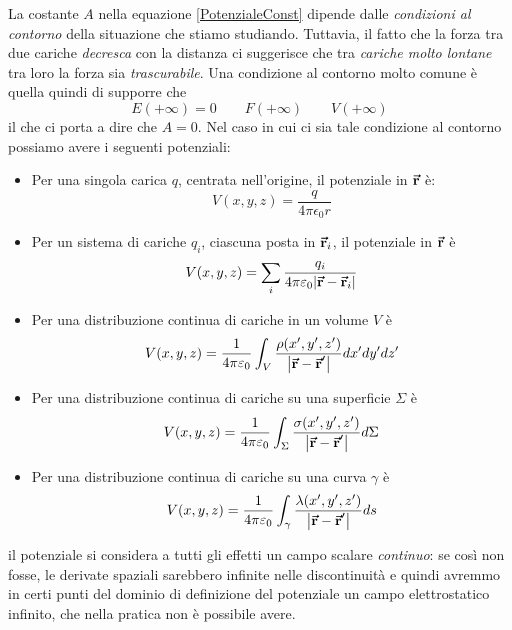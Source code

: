 La costante $A$ nella equazione \eqref{PotenzialeConst} dipende dalle \textit{condizioni al contorno} della situazione che stiamo studiando. Tuttavia, il fatto che la forza tra due cariche \textit{decresca} con la distanza ci suggerisce che tra \textit{cariche molto lontane} tra loro la forza sia \textit{trascurabile}. Una condizione al contorno molto comune è quella quindi di supporre che
\begin{equation}
	E(+\infty)=0\qquad F(+\infty)\qquad V(+\infty)
\end{equation}
il che ci porta a dire che $A=0$. Nel caso in cui ci sia tale condizione al contorno possiamo avere i seguenti potenziali:
\begin{itemize}
	\item Per una singola carica $q$, centrata nell'origine, il potenziale in $\vb*{\va{r}}$ è:
	\begin{equation}
		V(x,y,z)=\frac{q}{4\pi\epsilon_0r}
	\end{equation}
	\item Per un sistema di cariche $q_i$, ciascuna posta in $\vb*{\va{r}}_i$, il potenziale in $\vb*{\va{r}}$ è
	\begin{equation}
		V(x,y,z)=\sum_i\frac{q_i}{4\pi\varepsilon_0\abs{\vb*{\va{r}}-\vb*{\va{r}}_i}}
	\end{equation}
	\item Per una distribuzione continua di cariche in un volume $V$ è
	\begin{equation}
		V(x,y,z)=\frac{1}{4\pi\varepsilon_0}\int_{V}\frac{\rho(x',y',z')}{\abs{\vb*{\va{r}}-\vb*{\va{r}}'}}dx'dy'dz'
	\end{equation}
	\item Per una distribuzione continua di cariche su una superficie $\Sigma$ è
	\begin{equation}
		V(x,y,z)=\frac{1}{4\pi\varepsilon_0}\int_{\Sigma}\frac{\sigma(x',y',z')}{\abs{\vb*{\va{r}}-\vb*{\va{r}}'}}d\Sigma
	\end{equation}
	\item Per una distribuzione continua di cariche su una curva $\gamma$ è
	\begin{equation}
		V(x,y,z)=\frac{1}{4\pi\varepsilon_0}\int_\gamma\frac{\lambda(x',y',z')}{\abs{\vb*{\va{r}}-\vb*{\va{r}}'}}ds
	\end{equation}
\end{itemize}
\begin{observe}\label{PotenzialeContinuo}
	il potenziale si considera a tutti gli effetti un campo scalare \textit{continuo}: se così non fosse, le derivate spaziali sarebbero infinite nelle discontinuità e quindi avremmo in certi punti del dominio di definizione del potenziale un campo elettrostatico infinito, che nella pratica non è possibile avere.
\end{observe}

